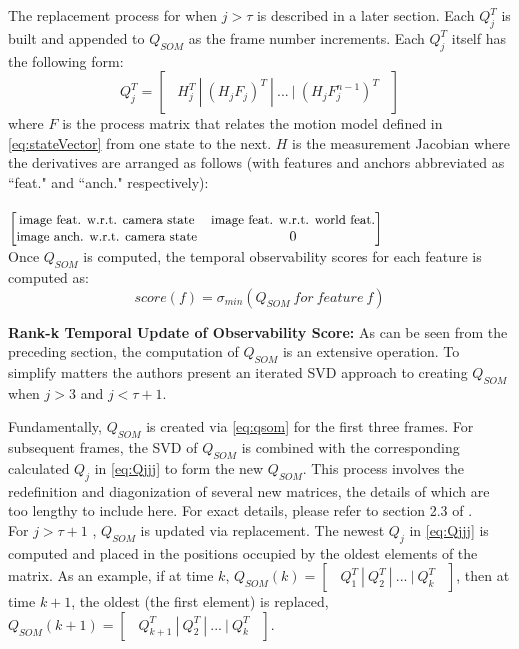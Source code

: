 \documentclass[10pt,twocolumn,letterpaper]{article}
\begin{document}
The replacement process for when $j>\tau$ is described in a later section. Each $Q_j^T$ is built and appended to ${Q}_{SOM}$ as the frame number increments. Each $Q_j^T$ itself has the following form: 
\begin{equation} \label{eq:Qjjj}
Q_j^T = \begin{bmatrix} \ \ H_j^T \ | \ (H_j F_j)^T \ | \ ... \ | \ (H_j F_j^{n-1})^T  \ \ \end{bmatrix}
\end{equation}
where $F$ is the process matrix that relates the motion model defined in \eqref{eq:stateVector} 
from one state to the next. $H$ is the measurement Jacobian where the derivatives are arranged as follows (with features and anchors abbreviated as ``feat." and ``anch." respectively):
\\\\
$\begin{bmatrix}
\small{\text{image feat. w.r.t. camera state}}&\small{\text{image feat. w.r.t. world feat.}}\\
\small{\text{image anch. w.r.t. camera state}}&0
\end{bmatrix}$\\

Once $Q_{SOM}$ is computed, the temporal observability scores for each feature is computed as:
\begin{equation} \label{eq:Qjjj}
score(f) = \sigma_{min}(Q_{SOM} \ for \ feature \ f)
\end{equation}

\textbf{Rank-k Temporal Update of Observability Score:} As can be seen from the preceding section, the computation of $Q_{SOM}$ is an extensive operation. To simplify matters the authors present an iterated SVD approach to creating $Q_{SOM}$ when $j>3$  and $j<\tau + 1$. 

Fundamentally, $Q_{SOM}$ is created via \eqref{eq:qsom} 
for the first three frames. For subsequent frames, the SVD of $Q_{SOM}$ is combined with the corresponding calculated ${Q}_{j}$ in \eqref{eq:Qjjj} to form the new $Q_{SOM}$. 
This process involves the redefinition and diagonization of several new matrices, the details of which are too lengthy to include here. For exact details, please refer to section 2.3 of \cite{Zhang_2015_CVPR}.\\
\indent{}For $j>\tau + 1$ , $Q_{SOM}$ is updated via replacement. The newest ${Q}_{j}$ in \eqref{eq:Qjjj} is computed and placed in the positions occupied by the oldest elements of the matrix. As an example, if at time $k$, $Q_{SOM}(k) = \begin{bmatrix} \ \ Q_1^T \ | \ Q_2^T \ | \ ... \ | \ Q_k^T  \ \ \end{bmatrix}$, then at time $k+1$, the oldest (\ie the first element) is replaced, ${Q}_{SOM}(k+1) = \begin{bmatrix}\ \ Q_{k+1}^T \ | \ Q_2^T \ | \ ... \ | \ Q_k^T\ \ \end{bmatrix}$.
\end{document}
